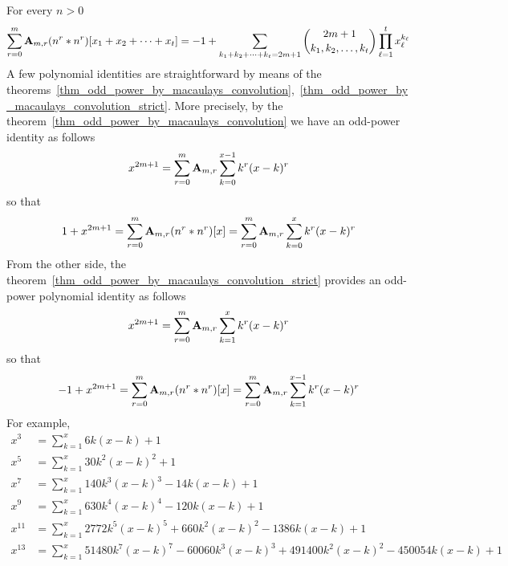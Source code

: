 For every $n>0$
\begin{align*}
    \sum_{r=0}^{m} \coeffA{m}{r} \convPower{n}{r}{\multifoldSum{t}} =
    -1 + \sum_{\multifoldSum[k]{t}=2m+1} \binom{2m+1}{k_1, k_2,\ldots, k_t} \prod_{\ell=1}^{t} x_\ell^{k_\ell}
\end{align*}
A few polynomial identities are straightforward by means of
the theorems~\eqref{thm_odd_power_by_macaulays_convolution},~\eqref{thm_odd_power_by_macaulays_convolution_strict}.
More precisely, by the theorem~\eqref{thm_odd_power_by_macaulays_convolution} we have an odd-power identity as follows
\begin{equation*}
    x^{2m+1} = \sum_{r=0}^{m} \coeffA{m}{r} \sum_{k=0}^{x-1} k^r (x-k)^r
\end{equation*}
so that
\begin{align*}
    1 + x^{2m+1} = \sum_{r=0}^{m} \coeffA{m}{r} \convPower{n}{r}{x}
    = \sum_{r=0}^{m} \coeffA{m}{r} \sum_{k=0}^{x} k^r (x-k)^r
\end{align*}
From the other side, the theorem~\eqref{thm_odd_power_by_macaulays_convolution_strict} provides an odd-power
polynomial identity as follows
\begin{equation*}
    x^{2m+1} = \sum_{r=0}^{m} \coeffA{m}{r} \sum_{k=1}^{x} k^r (x-k)^r
\end{equation*}
so that
\begin{equation*}
    -1 + x^{2m+1} = \sum_{r=0}^{m} \coeffA{m}{r} \convPower{n}{r}{x}
    = \sum_{r=0}^{m} \coeffA{m}{r} \sum_{k=1}^{x-1} k^r (x-k)^r
\end{equation*}
For example,
\begin{align*}
    x^3 &= \sum_{k=1}^{x} 6k (x-k) + 1 \\
    x^5 &= \sum_{k=1}^{x} 30k^2 (x-k)^2 + 1 \\
    x^7 &= \sum_{k=1}^{x} 140 k^3 (x-k)^3 - 14k(x-k) + 1 \\
    x^9 &= \sum_{k=1}^{x} 630 k^4(x-k)^4 - 120k(x-k) + 1 \\
    x^{11} &= \sum_{k=1}^{x} 2772 k^5 (x-k)^5 + 660 k^2(x-k)^2 - 1386k(x-k) + 1 \\
    x^{13} &= \sum_{k=1}^{x} 51480 k^7 (x-k)^7 - 60060 k^3 (x-k)^3 + 491400 k^2 (x-k)^{2} - 450054 k (x-k) + 1 \\
\end{align*}
